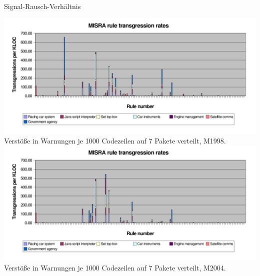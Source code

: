 \documentclass{beamer}
\begin{document}

    \begin{frame}{Signal-Rausch-Verhältnis}
        \begin{center}
            \begin{overprint}
                 {
                \includegraphics[width=\textwidth,height=0.8\textheight,keepaspectratio]{graphics/1998-transgression-rates.png}
                Verstöße in Warnungen je 1000 Codezeilen auf 7 Pakete verteilt, M1998.
                }
                 {
                \includegraphics[width=\textwidth,height=0.8\textheight,keepaspectratio]{graphics/2004-transgression-rates.png}
                Verstöße in Warnungen je 1000 Codezeilen auf 7 Pakete verteilt, M2004.
                }
            \end{overprint}
        \end{center}
    \end{frame}
\end{document}
